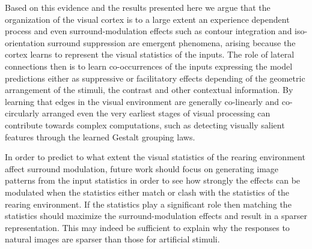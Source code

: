 Based on this evidence and the results presented here we argue that
the organization of the visual cortex is to a large extent an
experience dependent process and even surround-modulation effects such
as contour integration and iso-orientation surround suppression are
emergent phenomena, arising because the cortex learns to represent the
visual statistics of the inputs. The role of lateral connections then
is to learn co-occurrences of the inputs expressing the model
predictions either as suppressive or facilitatory effects depending of
the geometric arrangement of the stimuli, the contrast and other
contextual information. By learning that edges in the visual
environment are generally co-linearly and co-circularly arranged even
the very earliest stages of visual processing can contribute towards
complex computations, such as detecting visually salient features
through the learned Gestalt grouping laws.

In order to predict to what extent the visual statistics of the
rearing environment affect surround modulation, future
work should focus on generating image patterns from the input
statistics in order to see how strongly the effects can be modulated
when the statistics either match or clash with the statistics of the
rearing environment. If the statistics play a significant role then
matching the statistics should maximize the surround-modulation
effects and result in a sparser representation. This may indeed be
sufficient to explain why the responses to natural images are sparser
than those for artificial stimuli.


